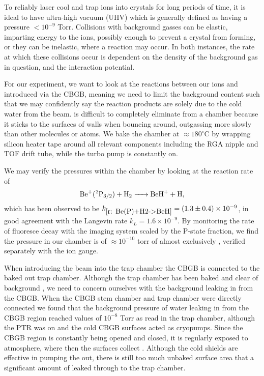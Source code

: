 To reliably laser cool and trap ions into crystals for long periods of time, it is ideal to have ultra-high vacuum (UHV) which is generally defined as having a pressure $<10^{-9}$ Torr. Collisions with background gasses can be elastic, imparting energy to the ions, possibly enough to prevent a crystal from forming, or they can be inelastic, where a reaction may occur. In both instances, the rate at which these collisions occur is dependent on the density of the background gas in question, and the interaction potential.

For our experiment, we want to look at the reactions between our ions and  introduced via the CBGB, meaning we need to limit the background  content such that we may confidently say the reaction products are solely due to the cold water from the beam.  is difficult to completely eliminate from a chamber because it sticks to the surfaces of walls when bouncing around, outgassing more slowly than other molecules or atoms. We bake the chamber at $\approx 180^\circ$C by wrapping silicon heater tape around all relevant components including the RGA nipple and TOF drift tube, while the turbo pump is constantly on.

We may verify the pressures within the chamber by looking at the reaction rate of
\begin{equation}
	\ce{Be+(^2P3/2) + H2 -> BeH+ + H},
	\label{r: Be(P)+H2->BeH}
\end{equation}
which has been observed to be $k_{\ref{r: Be(P)+H2->BeH}} = (1.3 \pm 0.4)\times 10^{-9}$, in good agreement with the Langevin rate $k_L=1.6 \times 10^{-9}$.\cite{Roth2006} By monitoring the rate of fluoresce decay with the imaging system scaled by the P-state fraction, we find the pressure in our chamber is of $\approx 10^{-10}$ torr of almost exclusively , verified separately with the ion gauge.

When introducing the beam into the trap chamber the CBGB is connected to the baked out trap chamber. Although the trap chamber has been baked and clear of background , we need to concern ourselves with the background  leaking in from the CBGB. When the CBGB stem chamber and trap chamber were directly connected we found that the background pressure of water leaking in from the CBGB region reached values of $10^{-8}$ Torr as read in the trap chamber, although the PTR was on and the cold CBGB surfaces acted as cryopumps. Since the CBGB region is constantly being opened and closed, it is regularly exposed to atmosphere, where then the surfaces collect . Although the cold shields are effective in pumping the  out, there is still too much unbaked surface area that a significant amount of  leaked through to the trap chamber.

